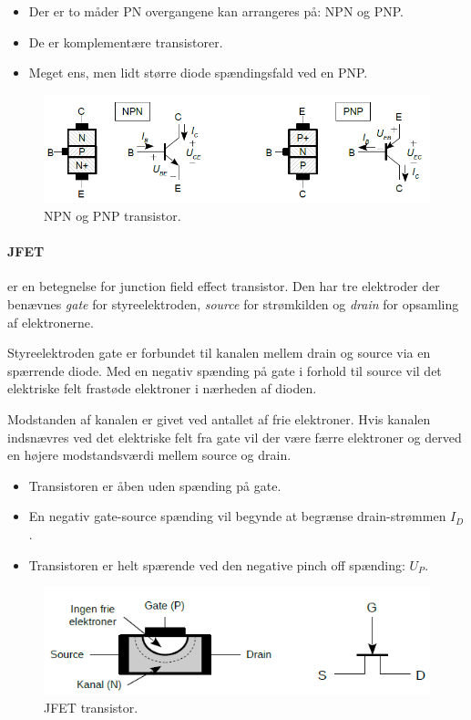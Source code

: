 \documentclass[danish]{article}
\begin{document}
\begin{itemize}
	\item Der er to måder PN overgangene kan arrangeres på: NPN og PNP.
	\item De er komplementære transistorer.
	\item Meget ens, men lidt større diode spændingsfald ved en PNP.
\end{itemize}

\begin{figure} [H]
	\centering
	\includegraphics[width=\linewidth]{graphics/transistor}
	\caption{NPN og PNP transistor.}
	\label{fig:transistor}
\end{figure}
\newpage
\paragraph{JFET} er en betegnelse for junction field effect transistor. 
Den har tre elektroder der benævnes \textit{gate} for styreelektroden, \textit{source} for strømkilden og \textit{drain} for opsamling af
elektronerne. 

Styreelektroden gate er forbundet til kanalen mellem drain og source via en spærrende diode. 
Med en negativ spænding på gate i forhold til source vil det elektriske felt frastøde elektroner i nærheden af dioden. 

Modstanden af kanalen er givet ved antallet af frie elektroner.
Hvis kanalen indsnævres ved det elektriske felt fra gate vil der være færre elektroner og derved en højere modstandsværdi mellem source og drain.

\begin{itemize}
	\item Transistoren er åben uden spænding på gate.
	\item En negativ gate-source spænding vil begynde at begrænse drain-strømmen $I_D$.
	\item Transistoren er helt spærende ved den negative pinch off spænding: $U_P$.
\end{itemize}

\begin{figure} [H]
	\centering
	\includegraphics[width=\linewidth]{graphics/jfet}
	\caption{JFET transistor.}
	\label{fig:jfet}
\end{figure}
\end{document}
